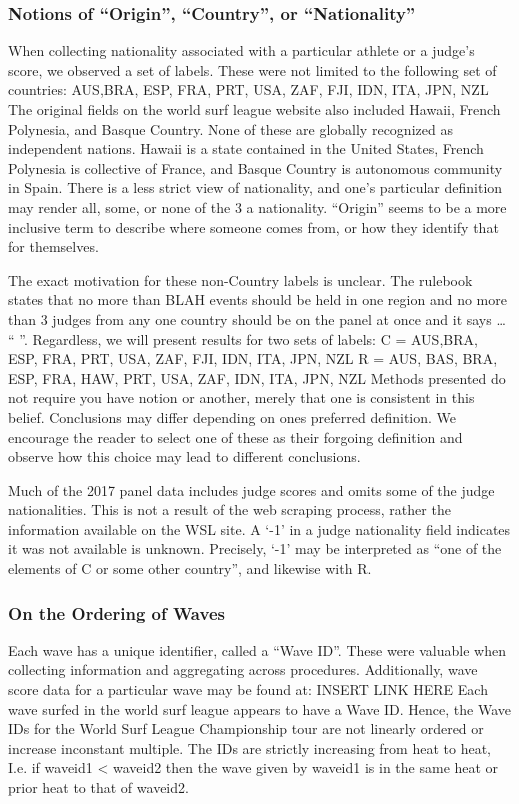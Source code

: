 \documentclass{article}
\begin{document}
\subsubsection{Notions of “Origin”, “Country”, or “Nationality”}
When collecting nationality associated with a particular athlete or a judge’s score, we observed a set of labels. These were not limited to the following set of countries:
	{AUS,BRA, ESP, FRA, PRT, USA, ZAF, FJI, IDN, ITA, JPN, NZL}
The original fields on the world surf league website also included Hawaii, French Polynesia, and Basque Country. None of these are globally recognized as independent nations. Hawaii is a state contained in the United States, French Polynesia is collective of France, and Basque Country is autonomous community in Spain. There is a less strict view of nationality, and one’s particular definition may render all, some, or none of the 3 a nationality. “Origin” seems to be a more inclusive term to describe where someone comes from, or how they identify that for themselves.

The exact motivation for these non-Country labels is unclear. The rulebook states that no more than BLAH events should be held in one region and no more than 3 judges from any one country should be on the panel at once and it says … “ ”.
Regardless, we will present results for two sets of labels:
C = {AUS,BRA, ESP, FRA, PRT, USA, ZAF, FJI, IDN, ITA, JPN, NZL}
R = {AUS, BAS, BRA, ESP, FRA, HAW, PRT, USA, ZAF, IDN, ITA, JPN, NZL}
Methods presented do not require you have notion or another, merely that one is consistent in this belief. Conclusions may differ depending on ones preferred definition. We encourage the reader to select one of these as their forgoing definition and observe how this choice may lead to different conclusions.

Much of the 2017 panel data includes judge scores and omits some of the judge nationalities. This is not a result of the web scraping process, rather the information available on the WSL site. A ‘-1’ in a judge nationality field indicates it was not available is unknown. Precisely, ‘-1’ may be interpreted as “one of the elements of C or some other country”, and likewise with R.

\subsubsection{On the Ordering of Waves}
Each wave has a unique identifier, called a “Wave ID”. These were valuable when collecting information and aggregating across procedures. Additionally, wave score data for a particular wave may be found at:
	INSERT LINK HERE
Each wave surfed in the world surf league appears to have a Wave ID. Hence, the Wave IDs for the World Surf League Championship tour are not linearly ordered or increase inconstant multiple. The IDs are strictly increasing from heat to heat, I.e. if waveid1 < waveid2 then the wave given by waveid1 is in the same heat or prior heat to that of waveid2. 
\end{document}
